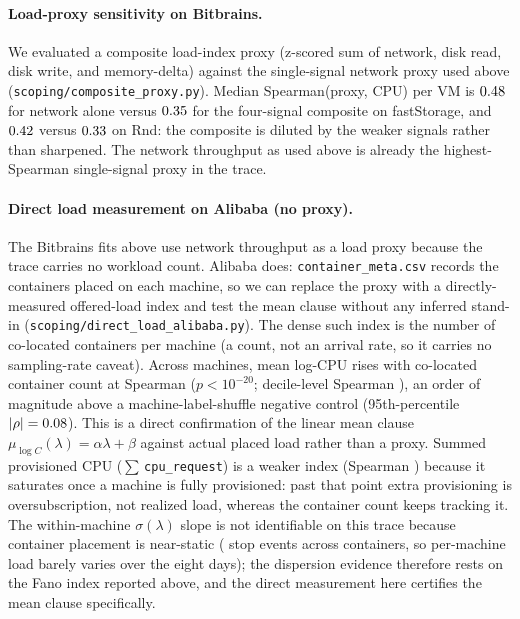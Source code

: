 \documentclass[11pt,a4paper]{article}
\begin{document}
\paragraph{Load-proxy sensitivity on Bitbrains.} We evaluated a
composite load-index proxy (z-scored sum of network, disk read, disk
write, and memory-delta) against the single-signal network proxy used
above (\texttt{scoping/composite\_proxy.py}). Median Spearman(proxy,
CPU) per VM is $0.48$ for network alone versus $0.35$ for the
four-signal composite on fastStorage, and $0.42$ versus $0.33$ on Rnd:
the composite is diluted by the weaker signals rather than sharpened.
The network throughput as used above is already the highest-Spearman
single-signal proxy in the trace.

\paragraph{Direct load measurement on Alibaba (no proxy).} The Bitbrains
fits above use network throughput as a load proxy because the trace
carries no workload count. Alibaba does: \texttt{container\_meta.csv}
records the containers placed on each machine, so we can replace the
proxy with a directly-measured offered-load index and test the mean
clause without any inferred stand-in
(\texttt{scoping/direct\_load\_alibaba.py}). The dense such index is the
number of co-located containers per machine (a count, not an
arrival rate, so it carries no sampling-rate caveat). Across
\DirNMach{} machines, mean log-CPU rises with co-located container count
at Spearman \DirNcontRho{} ($p < 10^{-20}$; decile-level Spearman
\DirNcontDecRho{}), an order of magnitude above a machine-label-shuffle
negative control (95th-percentile $|\rho| = 0.08{}$). This is a
direct confirmation of the linear mean clause $\mu_{\log C}(\lambda) =
\alpha\lambda + \beta$ against actual placed load rather than a proxy.
Summed provisioned CPU ($\sum$\,\texttt{cpu\_request}) is a weaker index
(Spearman \DirSumreqRho{}) because it saturates once a machine is fully
provisioned: past that point extra provisioning is oversubscription, not
realized load, whereas the container count keeps tracking it. The
within-machine $\sigma(\lambda)$ slope is not identifiable on this trace
because container placement is near-static (\DirNstops{} stop events
across \DirNcontainers{} containers, so per-machine load barely varies
over the eight days); the dispersion evidence therefore rests on the
Fano index reported above, and the direct measurement here certifies the
mean clause specifically.
\end{document}
